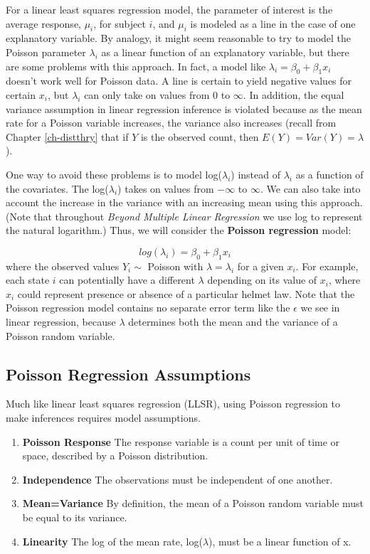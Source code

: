\documentclass[
]{krantz}
\providecommand{\tightlist}{%
  \setlength{\itemsep}{0pt}\setlength{\parskip}{0pt}}
\begin{document}
For a linear least squares regression model, the parameter of interest is the average response, \(\mu_i\), for subject \(i\), and \(\mu_i\) is modeled as a line in the case of one explanatory variable. By analogy, it might seem reasonable to try to model the Poisson parameter \(\lambda_i\) as a linear function of an explanatory variable, but there are some problems with this approach. In fact, a model like \(\lambda_i=\beta_0+\beta_1x_i\) doesn't work well for Poisson data. A line is certain to yield negative values for certain \(x_i\), but \(\lambda_i\) can only take on values from 0 to \(\infty\). In addition, the equal variance assumption in linear regression inference is violated because as the mean rate for a Poisson variable increases, the variance also increases (recall from Chapter \ref{ch-distthry} that if \(Y\) is the observed count, then \(E(Y)=Var(Y)=\lambda\)).

One way to avoid these problems is to model log(\(\lambda_i\)) instead of \(\lambda_i\) as a function of the covariates. The log(\(\lambda_i\)) takes on values from \(-\infty\) to \(\infty\). We can also take into account the increase in the variance with an increasing mean using this approach. (Note that throughout \emph{Beyond Multiple Linear Regression} we use log to represent the natural logarithm.) Thus, we will consider the \textbf{Poisson regression}  model:

\begin{equation*}
log(\lambda_i)=\beta_0+\beta_1 x_i
\end{equation*}
where the observed values \(Y_i \sim\) Poisson with \(\lambda=\lambda_i\) for a given \(x_i\). For example, each state \(i\) can potentially have a different \(\lambda\) depending on its value of \(x_i\), where \(x_i\) could represent presence or absence of a particular helmet law. Note that the Poisson regression model contains no separate error term like the \(\epsilon\) we see in linear regression, because \(\lambda\) determines both the mean and the variance of a Poisson random variable.

\subsection{Poisson Regression Assumptions}\label{poisson-regression-assumptions}

Much like linear least squares regression (LLSR), using Poisson regression to make inferences requires model assumptions.

\begin{enumerate}
\def\labelenumi{\arabic{enumi}.}
\tightlist
\item
  \textbf{Poisson Response} The response variable is a count per unit of time or space, described by a Poisson distribution.
\item
  \textbf{Independence} The observations must be independent of one another.
\item
  \textbf{Mean=Variance} By definition, the mean of a Poisson random variable must be equal to its variance.
\item
  \textbf{Linearity} The log of the mean rate, log(\(\lambda\)), must be a linear function of x.
\end{enumerate}
\end{document}
